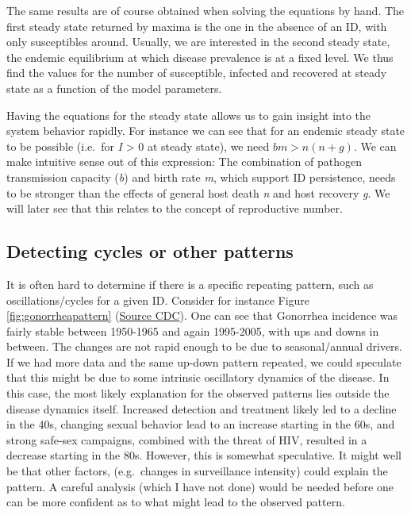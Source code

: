 \documentclass[]{article}
\theoremstyle{definition}
\theoremstyle{definition}
\theoremstyle{definition}
\theoremstyle{remark}
\begin{document}
The same results are of course obtained when solving the equations by
hand. The first steady state returned by maxima is the one in the
absence of an ID, with only susceptibles around. Usually, we are
interested in the second steady state, the endemic equilibrium at which
disease prevalence is at a fixed level. We thus find the values for the
number of susceptible, infected and recovered at steady state as a
function of the model parameters.

Having the equations for the steady state allows us to gain insight into
the system behavior rapidly. For instance we can see that for an endemic
steady state to be possible (i.e.~for \emph{I} \textgreater{} 0 at
steady state), we need \(b m > n (n+ g)\). We can make intuitive sense
out of this expression: The combination of pathogen transmission
capacity (\emph{b}) and birth rate \emph{m}, which support ID
persistence, needs to be stronger than the effects of general host death
\emph{n} and host recovery \emph{g}. We will later see that this relates
to the concept of reproductive number.

\subsection{Detecting cycles or other
patterns}\label{detecting-cycles-or-other-patterns}

It is often hard to determine if there is a specific repeating pattern,
such as oscillations/cycles for a given ID. Consider for instance Figure
\ref{fig:gonorrheapattern}
(\href{http://www.cdc.gov/STD/stats06/images/trends-img-2.gif}{Source
CDC}). One can see that Gonorrhea incidence was fairly stable between
1950-1965 and again 1995-2005, with ups and downs in between. The
changes are not rapid enough to be due to seasonal/annual drivers. If we
had more data and the same up-down pattern repeated, we could speculate
that this might be due to some intrinsic oscillatory dynamics of the
disease. In this case, the most likely explanation for the observed
patterns lies outside the disease dynamics itself. Increased detection
and treatment likely led to a decline in the 40s, changing sexual
behavior lead to an increase starting in the 60s, and strong safe-sex
campaigns, combined with the threat of HIV, resulted in a decrease
starting in the 80s. However, this is somewhat speculative. It might
well be that other factors, (e.g.~changes in surveillance intensity)
could explain the pattern. A careful analysis (which I have not done)
would be needed before one can be more confident as to what might lead
to the observed pattern.
\end{document}
